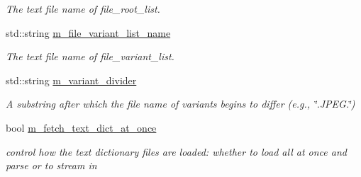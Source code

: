 \begin{DoxyCompactItemize}
\begin{DoxyCompactList}\small\item\em The text file name of file\+\_\+root\+\_\+list. \end{DoxyCompactList}\item 
std\+::string \hyperlink{classlbann_1_1offline__patches__npz_acf3a819a993f1dafd040e992fcbd205a}{m\+\_\+file\+\_\+variant\+\_\+list\+\_\+name}
\begin{DoxyCompactList}\small\item\em The text file name of file\+\_\+variant\+\_\+list. \end{DoxyCompactList}\item 
std\+::string \hyperlink{classlbann_1_1offline__patches__npz_aaab0b9040ce248875b6cdb430e054b3a}{m\+\_\+variant\+\_\+divider}
\begin{DoxyCompactList}\small\item\em A substring after which the file name of variants begins to differ (e.\+g., \char`\"{}.\+J\+P\+E\+G.\char`\"{}) \end{DoxyCompactList}\item 
bool \hyperlink{classlbann_1_1offline__patches__npz_a887aa89aa2d8d8c9e23af33f2bb949d9}{m\+\_\+fetch\+\_\+text\+\_\+dict\+\_\+at\+\_\+once}
\begin{DoxyCompactList}\small\item\em control how the text dictionary files are loaded\+: whether to load all at once and parse or to stream in \end{DoxyCompactList}\end{DoxyCompactItemize}


